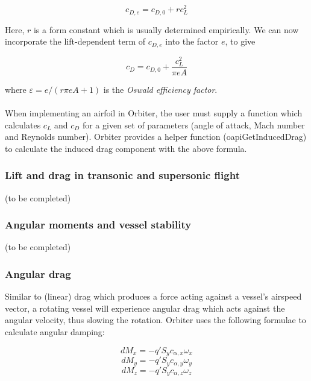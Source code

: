 \documentclass[Orbiter Developer Manual.tex]{subfiles}
\begin{document}
\[ c_{D,e} = c_{D,0} + rc_{L}^{2} \]

\noindent
Here, $r$ is a form constant which is usually determined empirically. We can now incorporate the lift-dependent term of $c_{D,e}$ into the factor $e$, to give

\[ c_{D} = c_{D,0} + \frac{c_{L}^{2}}{\pi eA} \]

\noindent
where $\varepsilon = e / (r \pi eA + 1)$ is the \textit{Oswald efficiency factor}.\\
\\
When implementing an airfoil in Orbiter, the user must supply a function which calculates $c_{L}$ and $c_{D}$ for a given set of parameters (angle of attack, Mach number and Reynolds number). Orbiter provides a helper function (oapiGetInducedDrag) to calculate the induced drag component with the above formula.


\subsubsection{Lift and drag in transonic and supersonic flight}
(to be completed)


\subsubsection{Angular moments and vessel stability}
(to be completed)


\subsubsection{Angular drag}
Similar to (linear) drag which produces a force acting against a vessel's airspeed vector, a rotating vessel will experience angular drag which acts against the angular velocity, thus slowing the rotation. Orbiter uses the following formulae to calculate angular damping:

\[ dM_{x} = -q'S_{y}c_{\alpha,x}\omega_{x} \]
\[ dM_{y} = -q'S_{y}c_{\alpha,y}\omega_{y} \]
\[ dM_{z} = -q'S_{y}c_{\alpha,z}\omega_{z} \]
\end{document}
